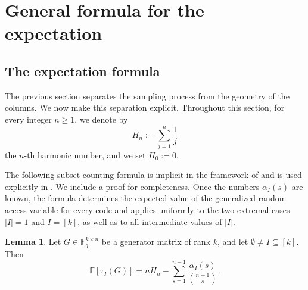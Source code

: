 \documentclass[11pt,a4paper]{article}
\numberwithin{equation}{section}
\theoremstyle{definition}
\theoremstyle{definition}
\newtheorem{lemma}[definition]{Lemma}
\newcommand{\F}{\mathbb{F}}
\newcommand{\E}{\mathbb{E}}
\begin{document}
\section{General formula for the expectation}\label{sec:general-expectation}

\subsection{The expectation formula}\label{subsec:expectation-formula}

The previous section separates the sampling process from the geometry of the columns. We now make this separation explicit. Throughout this section, for every integer $n\geq 1$, we denote by
\[
H_n:=\sum_{j=1}^n \frac{1}{j}
\]
the $n$-th harmonic number, and we set $H_0:=0$.

{The following subset-counting formula is implicit in the framework of \cite{gruica2024combinatorial} and is used explicitly in \cite{BarLev2026CodedRetrieval}.  We include a proof for completeness.  Once the numbers $\alpha_I(s)$ are known, the formula determines the expected value of the generalized random access variable for every code and applies uniformly to the two extremal cases $|I|=1$ and $I=[k]$, as well as to all intermediate values of $|I|$.}

\begin{lemma}\label{lem:general-expectation}
Let $G\in \F_q^{k\times n}$ be a generator matrix of rank $k$, and let $\emptyset\neq I\subseteq [k]$. Then
\begin{equation}\label{eq:general-expectation}
\E[\tau_I(G)]
= nH_n-\sum_{s=1}^{n-1}\frac{\alpha_I(s)}{\binom{n-1}{s}}.
\end{equation}
\end{lemma}
\end{document}

